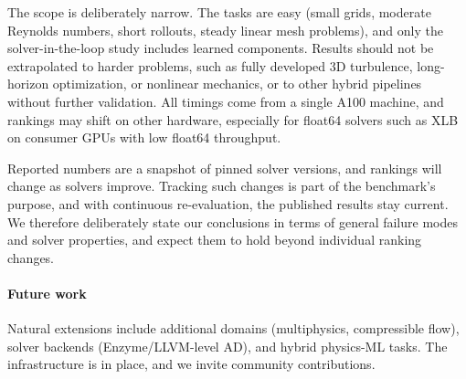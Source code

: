 The scope is deliberately narrow. The tasks are easy (small grids, moderate
Reynolds numbers, short rollouts, steady linear mesh problems), and only
the solver-in-the-loop study includes learned components. Results should
not be extrapolated to harder problems, such as fully developed 3D
turbulence, long-horizon optimization, or nonlinear mechanics, or to other
hybrid pipelines without further validation. All timings come from a
single A100 machine, and rankings may shift on other hardware, especially for
float64 solvers such as XLB on consumer GPUs with low float64 throughput.

Reported numbers are a snapshot of pinned solver versions, and rankings will
change as solvers improve. Tracking such changes is part of the benchmark's
purpose, and with continuous re-evaluation, the published results stay
current. We therefore deliberately state our conclusions in terms of general
failure modes and solver properties, and expect them to hold beyond individual
ranking changes.

\paragraph{Future work}
Natural extensions include additional domains (multiphysics, compressible
flow), solver backends (Enzyme/LLVM-level AD), and hybrid physics-ML tasks.
The infrastructure is in place, and we invite community contributions.
